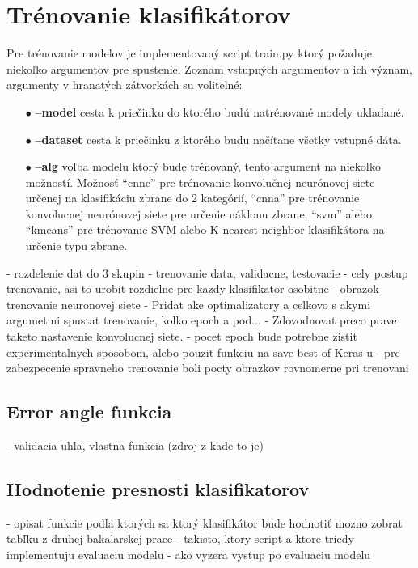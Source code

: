 
\section{Trénovanie klasifikátorov}
\label{sec:trenovanie}
Pre trénovanie modelov je implementovaný script train.py ktorý požaduje niekoľko argumentov pre spustenie.
Zoznam vstupných argumentov a ich význam, argumenty v hranatých zátvorkách su volitelné:
\begin{enumerate}
  \item[$\bullet$] \textbf{--model} cesta k priečinku do ktorého budú natrénované modely ukladané.
  \item[$\bullet$] \textbf{--dataset} cesta k priečinku z ktorého budu načítane všetky vstupné dáta.
  \item[$\bullet$] \textbf{--alg} voľba modelu ktorý bude trénovaný, tento argument na niekoľko možností.
  Možnosť ``cnnc'' pre trénovanie konvolučnej neurónovej siete určenej na klasifikáciu zbrane do 2 kategórií,
  ``cnna'' pre trénovanie konvolucnej neurónovej siete pre určenie náklonu zbrane,
  ``svm'' alebo ``kmeans'' pre trénovanie SVM alebo K-nearest-neighbor klasifikátora na určenie typu zbrane.
\end{enumerate}


- rozdelenie dat do 3 skupin - trenovanie data, validacne, testovacie
- cely postup trenovanie, asi to urobit rozdielne pre kazdy klasifikator osobitne
- obrazok trenovanie neuronovej siete
- Pridat ake optimalizatory a celkovo s akymi argumetmi spustat trenovanie, kolko epoch a pod...
- Zdovodnovat preco prave taketo nastavenie konvolucnej siete.
- pocet epoch bude potrebne zistit experimentalnych sposobom, alebo pouzit funkciu na save best of Keras-u
- pre zabezpecenie spravneho trenovanie boli pocty obrazkov rovnomerne pri trenovani

\subsection{Error angle funkcia}
\label{subsec:errorangle}
- validacia uhla, vlastna funkcia (zdroj z kade to je)

\subsection{Hodnotenie presnosti klasifikatorov}
\label{subsec:hodnoteniepresnosti}
- opisat funkcie podľa ktorých sa ktorý klasifikátor bude hodnotiť
  mozno zobrat tabľku z druhej bakalarskej prace
- takisto, ktory script a ktore triedy implementuju evaluaciu modelu
- ako vyzera vystup po evaluaciu modelu
